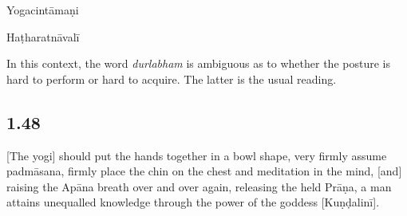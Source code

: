 \begin{ekdosis}
\begin{sources}[hp01_047]
\begin{versinnote}
\end{versinnote}

\end{sources}

\begin{testimonia}[hp01_047]
Yogacintāmaṇi

\begin{versinnote}
\end{versinnote}

Haṭharatnāvalī

\begin{versinnote}
\end{versinnote}

\end{testimonia}

\begin{philcomm}[hp01_047]
In this context, the word \emph{durlabham} is ambiguous as to whether the posture is hard to perform or hard to acquire. The latter is the usual reading.
\end{philcomm}

\subsection*{1.48}
\begin{translation}[hp01_048]

[The yogi] should put the hands together in a bowl shape, very firmly assume padmāsana, firmly place the chin on the chest and meditation in the mind, [and] raising the Apāna breath over and over again, releasing the held Prāṇa, a man attains unequalled knowledge through the power of the goddess [Kuṇḍalinī].
\end{translation}


\end{ekdosis}
